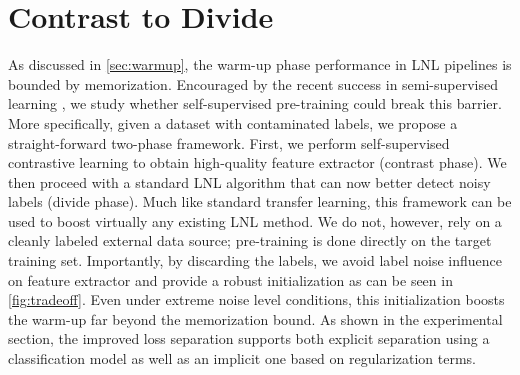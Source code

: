 \documentclass[10pt,twocolumn,letterpaper]{article}
\renewcommand{\cite}[1]{\citep{#1}}
\begin{document}
\section{Contrast to Divide}
\label{sec:method}
As discussed in \cref{sec:warmup}, the warm-up phase performance in LNL pipelines is bounded by memorization. Encouraged by the recent success in semi-supervised learning \cite{chen2020simclr2}, we study whether self-supervised pre-training could break this barrier. More specifically, given a dataset with contaminated labels, we propose a straight-forward two-phase framework. First, we perform self-supervised contrastive learning \cite{chen2020simclr,zbontar2021barlow} to obtain high-quality feature extractor (contrast phase). We then proceed with a standard LNL algorithm that can now better detect noisy labels (divide phase). Much like standard transfer learning, this framework can be used to boost virtually any existing LNL method. We do not, however, rely on a cleanly labeled external data source; pre-training is done directly on the target training set. Importantly, by discarding the labels, we avoid label noise influence on feature extractor and provide a robust initialization as can be seen in \cref{fig:tradeoff}. Even under extreme noise level conditions, this initialization boosts the warm-up far beyond the memorization bound. 
As shown in the experimental section, the improved loss separation supports both explicit separation using a classification model as well as an implicit one based on regularization terms.
%
 
\end{document}
